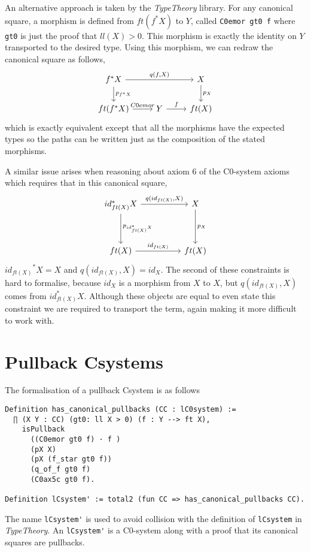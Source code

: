 An alternative approach is taken by the \textit{TypeTheory} library. For any
canonical square, a morphism is defined from $ft(f^*X)$ to $Y$, called 
\lstinline|C0emor gt0 f| where \lstinline|gt0| is just the proof that $ll(X)>0$. This
morphism is exactly the identity on $Y$ transported to the desired type. Using
this morphism, we can redraw the canonical square as follows,
\[
\begin{tikzcd}
    f^*X\ar[rr,"{q(f,X)}"]\ar[d,"p_{f^*X}"]&&X\ar[d,"p_X"] \\
    ft(f^*X)\ar[r,"C0emor"]&Y\ar[r,"f"]&ft(X)
\end{tikzcd}
\]
which is exactly equivalent except that all the morphisms have the expected
types so the paths can be written just as the composition of the stated
morphisms.

A similar issue arises when reasoning about axiom 6 of the C0-system axioms
which requires that in this canonical square,
\[
\begin{tikzcd}[sep=huge]
    {id_{ft(X)}^*X}
    \ar[r, "{q(id_{ft(X)}, X)}"]
    \ar[d, "p_{id_{ft(X)}^*X}"]&
    X\ar[d, "p_X"] \\
    ft(X)
    \ar[r, "id_{ft(X)}"]&
    ft(X)
\end{tikzcd}
\]
${id_{ft(X)}}^*X = X$ and $q(id_{ft(X)}, X) = id_X$. The second of these
constraints is hard to formalise, because $id_X$ is a morphism from $X$ to $X$,
but $q(id_{ft(X)}, X)$ comes from $id_{ft(X)}^*X$. Although these objects are
equal to even state this constraint we are required to transport the term, again
making it more difficult to work with.

\section{Pullback Csystems}
The formalisation of a pullback Csystem is as follows
\begin{lstlisting}
Definition has_canonical_pullbacks (CC : lC0system) := 
  ∏ (X Y : CC) (gt0: ll X > 0) (f : Y --> ft X), 
    isPullback 
      ((C0emor gt0 f) · f )
      (pX X) 
      (pX (f_star gt0 f))
      (q_of_f gt0 f)
      (C0ax5c gt0 f).

Definition lCsystem' := total2 (fun CC => has_canonical_pullbacks CC).
\end{lstlisting}

The name \lstinline|lCsystem'| is used to avoid collision with the definition of
\lstinline|lCsystem| in \textit{TypeTheory}. An \lstinline|lCsystem'| is a
C0-system along with a proof that its canonical squares are pullbacks.

